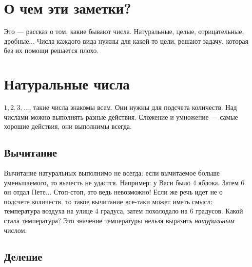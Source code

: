 \documentclass[a4paper,12pt]{article}
\begin{document}
    \section{О чем эти заметки?}
    Это --- рассказ о том, какие бывают числа. Натуральные, целые, отри\-ца\-тель\-ные, дробные... Числа каждого вида нужны для какой-то цели, решают задачу,
    которая без их помощи решается плохо.

    \section{Натуральные числа}
    $1, 2, 3, \ldots$, такие числа знакомы всем. Они нужны для подсчета количеств.
    Над числами можно выполнять
    разные действия. Сложение и умножение --- самые хорошие действия,
    они выполнимы всегда. 
    
    \subsection{Вычитание}
    Вычитание натуральных выполнимо не всегда: если вычитаемое больше 
    уменьшаемого, то вычесть не удастся. Например: у Васи было 4 яблока. 
    Затем 6 он отдал Пете... Стоп-стоп, это ведь невозможно!
    Если же речь идет не о подсчете количеств, то такое вычитание 
    все-таки может иметь смысл: температура воздуха на улице
    4 градуса, затем похолодало на 6 градусов. Какой стала
    температура? Это значение температуры нельзя выразить \emph{натуральным}
    числом.

    \subsection{Деление}
    \begin{figure}[h]
        \centering
\end{figure}
\end{document}
